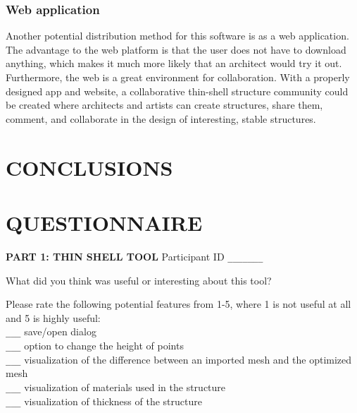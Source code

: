 \documentclass{thesis}
\begin{document}
\subsection{Web application}
Another potential distribution method for this software is as a web application.  The advantage to the web platform is that the
user does not have to download anything, which makes it much more likely that an architect would try it out.  Furthermore, the
web is a great environment for collaboration.  With a properly designed app and website, a collaborative thin-shell structure
community could be created where architects and artists can create structures, share them, comment, and collaborate in the
design of interesting, stable structures.

\chapter{CONCLUSIONS}



\begin{singlespace}


\end{singlespace}

\appendix    %
\chapter{QUESTIONNAIRE}
\setlength{\parindent}{0in} 
{\bf PART 1: THIN SHELL TOOL} 
\hfill Participant ID \verb+_______+
\vspace{0.3in}

What did you think was useful or interesting about this tool?
\vspace{1.1in}

Please rate the following potential features from 1-5, where 1 is not useful at all and 5 is highly useful: \\

\verb+___+ save/open dialog\\
\verb+___+ option to change the height of points\\
\verb+___+ visualization of the difference between an imported mesh and the optimized mesh\\
\verb+___+ visualization of materials used in the structure\\
\verb+___+ visualization of thickness of the structure
\end{document}
